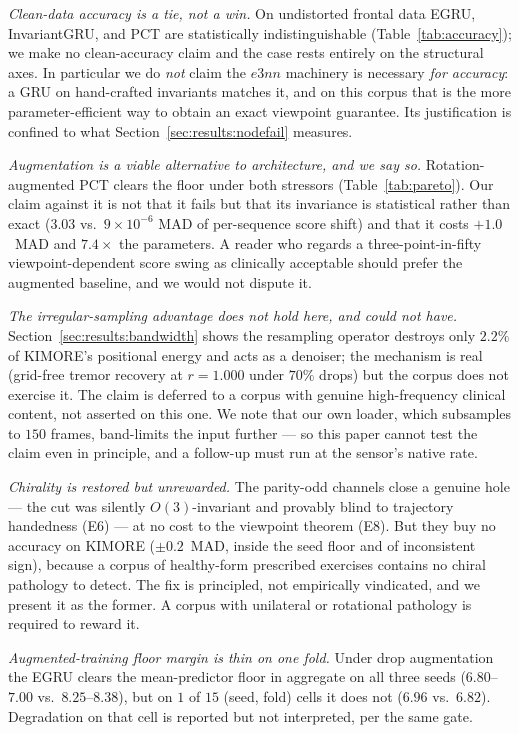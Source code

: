 \emph{Clean-data accuracy is a tie, not a win.} On undistorted frontal data EGRU, InvariantGRU, and
PCT are statistically indistinguishable (Table~\ref{tab:accuracy}); we make no clean-accuracy claim
and the case rests entirely on the structural axes. In particular we do \emph{not} claim the $e3nn$
machinery is necessary \emph{for accuracy}: a GRU on hand-crafted invariants matches it, and on this
corpus that is the more parameter-efficient way to obtain an exact viewpoint guarantee. Its
justification is confined to what Section~\ref{sec:results:nodefail} measures.

\emph{Augmentation is a viable alternative to architecture, and we say so.} Rotation-augmented PCT
clears the floor under both stressors (Table~\ref{tab:pareto}). Our claim against it is not that it
fails but that its invariance is statistical rather than exact ($3.03$ vs.\ $9\times10^{-6}$ MAD of
per-sequence score shift) and that it costs $+1.0$~MAD and $7.4\times$ the parameters. A reader who
regards a three-point-in-fifty viewpoint-dependent score swing as clinically acceptable should prefer
the augmented baseline, and we would not dispute it.

\emph{The irregular-sampling advantage does not hold here, and could not have.}
Section~\ref{sec:results:bandwidth} shows the resampling operator destroys only $2.2\%$ of KIMORE's
positional energy and acts as a denoiser; the mechanism is real (grid-free tremor recovery at
$r=1.000$ under $70\%$ drops) but the corpus does not exercise it. The claim is deferred to a corpus
with genuine high-frequency clinical content, not asserted on this one. We note that our own loader,
which subsamples to $150$ frames, band-limits the input further --- so this paper cannot test the
claim even in principle, and a follow-up must run at the sensor's native rate.

\emph{Chirality is restored but unrewarded.} The parity-odd channels close a genuine hole --- the cut
was silently $O(3)$-invariant and provably blind to trajectory handedness (E6) --- at no cost to the
viewpoint theorem (E8). But they buy no accuracy on KIMORE ($\pm0.2$~MAD, inside the seed floor and of
inconsistent sign), because a corpus of healthy-form prescribed exercises contains no chiral
pathology to detect. The fix is principled, not empirically vindicated, and we present it as the
former. A corpus with unilateral or rotational pathology is required to reward it.

\emph{Augmented-training floor margin is thin on one fold.} Under drop augmentation the EGRU clears
the mean-predictor floor in aggregate on all three seeds ($6.80$--$7.00$ vs.\ $8.25$--$8.38$), but
on $1$ of $15$ (seed, fold) cells it does not ($6.96$ vs.\ $6.82$). Degradation on that cell is
reported but not interpreted, per the same gate.
